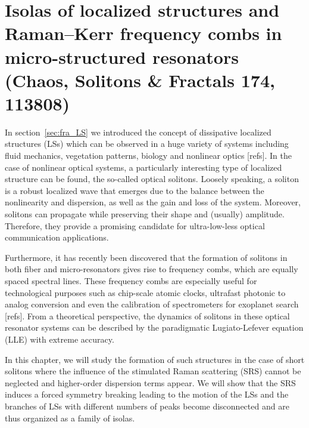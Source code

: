 \chapter{Isolas of localized structures and Raman–Kerr frequency combs in micro-structured resonators (Chaos, Solitons \& Fractals 174, 113808)}

In section~\ref{sec:fra_LS} we introduced the concept of dissipative 
localized structures (LSs) which can be observed in a huge variety
of systems including fluid mechanics, vegetation patterns, biology and 
nonlinear optics [refs]. In the case of nonlinear optical systems,
a particularly interesting type of localized structure can be found,
the so-called optical solitons. Loosely speaking, a soliton
is a robust localized wave that emerges due to the balance between the nonlinearity
and dispersion, as well as the gain and loss of the system. Moreover,
solitons can propagate while preserving their shape and (usually) amplitude.
Therefore, they provide a promising candidate for ultra-low-less optical communication
applications.

Furthermore, it has recently been discovered that the formation of solitons
in both fiber and micro-resonators gives rise to frequency combs, which are equally
spaced spectral lines. These frequency combs are especially useful
for technological purposes such as chip-scale atomic clocks, ultrafast 
photonic to analog conversion and even the calibration of spectrometers
for exoplanet search [refs]. From a theoretical perspective, the dynamics
of solitons in these optical resonator systems can be described 
by the paradigmatic Lugiato-Lefever equation (LLE) \cite{lugiatolefever1987}
with extreme accuracy.

In this chapter, we will study the formation of such structures in the
case of short solitons where the influence of the stimulated Raman scattering (SRS)
cannot be neglected and higher-order dispersion terms appear. We will show
that the SRS induces a forced symmetry breaking leading to the motion
of the LSs and the branches of 
LSs with different numbers of peaks become disconnected and are thus organized
as a family of isolas.  